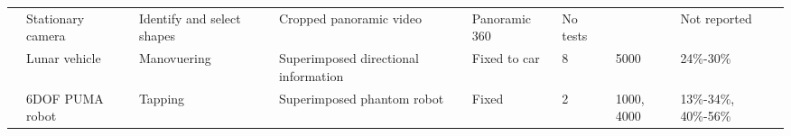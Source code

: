\begin{wraptable}{o}[20pt]{0.45\textwidth}
{{\begin{tabular}{@{}llllllll@{}}
\cite{Baldwin1999}       & Stationary camera         & Identify and select shapes & Cropped panoramic video                  & Panoramic 360       & No tests     &                & Not reported         \\
\cite{Mathan1996}        & Lunar vehicle             & Manovuering                & Superimposed directional information     & Fixed to car        & 8            & 5000           & 24\%-30\%            \\
\cite{Bejczy1990}        & 6DOF PUMA robot           & Tapping                    & Superimposed phantom robot               & Fixed               & 2            & 1000, 4000     & 13\%-34\%, 40\%-56\% \\ \bottomrule
\end{tabular}
}
}
\end{wraptable}
